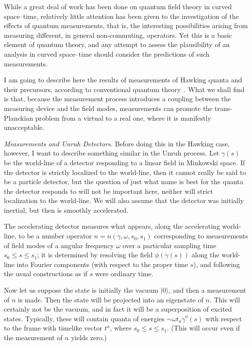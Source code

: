 \documentclass[
%
draft    %
,numberedheadings 
,bibliocites
  ]
  {aipproc}
\begin{document}
While a great deal of work has been done on quantum field theory in curved space--time, relatively little attention has been given to the investigation of the effects of quantum measurements, that is, the interesting possibilities arising from measuring different, in general non-commuting, operators.  Yet this is a basic element of quantum theory, and any attempt to assess the plausibility of an analysis in curved space--time should consider the predictions of such measurements.

I am going to describe here the results of measurements of Hawking quanta and their precursors, according to conventional quantum theory~\citep{Helfer:2004jx}.  What we shall find is that, because the measurement process introduces a coupling between the measuring device and the field modes, measurements can promote the trans-Planckian problem from a virtual to a real one, where it is manifestly unacceptable.

{\em Measurements and Unruh Detectors.}
Before doing this in the Hawking case, however, I want to describe something similar in the Unruh process.  Let $\gamma (s)$ be the world-line of a detector responding to a linear field in Minkowski space.  If the detector is strictly localized to the world-line, then it cannot really be said to be a particle detector, but the question of just what name is best for the quanta the detector responds to will not be important here, neither will strict localization to the world-line.  We will also assume that the detector was initially inertial, but then is smoothly accelerated.

The accelerating detector measures what appears, along  the accelerating world-line, to be a number operator $n=n(\gamma ,\omega , s_0,s_1)$ corresponding to measurements of field modes of a angular frequency $\omega$ over a particular sampling time $s_0\leq s\leq s_1$; it is determined by 
resolving the field $\phi (\gamma (s))$ along the world-line into Fourier components (with respect to the proper time $s$), and following the usual constructions as if $s$ were ordinary time.  

Now let us suppose the state is initially the vacuum $|0\rangle$, and then a measurement of $n$ is made.  Then the state will be projected into an eigenstate of $n$.  This will certainly not be the vacuum, and in fact it will be a superposition of excited states.  Typically, these will contain quanta of energies $\sim \omega t_a\dot\gamma ^a(s)$ with respect to the frame with timelike vector $t^a$, where $s_0\leq s\leq s_1$.  (This will occur even if the measurement of $n$ yields zero.)
\end{document}
